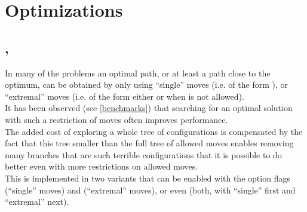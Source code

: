 \section{Optimizations}
\subsection{, }

In many of the problems an optimal path, or at least a path close to the optimum,
can be obtained by only using ``single'' moves (i.e. of the form ),
or ``extremal'' moves (i.e. of the form either  or  when
 is not allowed).\\

It has been observed (see \ref{benchmarks}) that searching for an optimal
solution with such a restriction of moves often improves performance.\\
The added cost of exploring a whole tree of configurations is compensated
by the fact that this tree smaller than the full tree of allowed moves
enables removing many branches that are such terrible configurations
that it is possible to do better even with more restrictions on allowed moves.\\

This is implemented in two variants that can be enabled with the option flags
 (``single'' moves) and  (``extremal'' moves), or even
 (both, with ``single'' first and ``extremal'' next).\\

